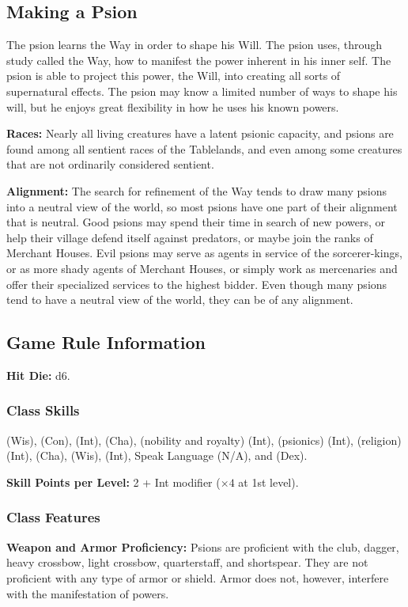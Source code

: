 \subsection{Making a Psion}
The psion learns the Way in order to shape his Will. The psion uses, through study called the Way, how to manifest the power inherent in his inner self. The psion is able to project this power, the Will, into creating all sorts of supernatural effects. The psion may know a limited number of ways to shape his will, but he enjoys great flexibility in how he uses his known powers.

\textbf{Races:} Nearly all living creatures have a latent psionic capacity, and psions are found among all sentient races of the Tablelands, and even among some creatures that are not ordinarily considered sentient.

\textbf{Alignment:} The search for refinement of the Way tends to draw many psions into a neutral view of the world, so most psions have one part of their alignment that is neutral. Good psions may spend their time in search of new powers, or help their village defend itself against predators, or maybe join the ranks of Merchant Houses. Evil psions may serve as agents in service of the sorcerer-kings, or as more shady agents of Merchant Houses, or simply work as mercenaries and offer their specialized services to the highest bidder. Even though many psions tend to have a neutral view of the world, they can be of any alignment.

\subsection{Game Rule Information}
\textbf{Hit Die:} d6.

\subsubsection{Class Skills}
 (Wis),  (Con),  (Int),  (Cha),  (nobility and royalty) (Int),  (psionics) (Int),  (religion) (Int),  (Cha),  (Wis),  (Int), Speak Language (N/A), and  (Dex).

\textbf{Skill Points per Level:} 2 + Int modifier ($\times 4$ at 1st level).

\subsubsection{Class Features}
\textbf{Weapon and Armor Proficiency:} Psions are proficient with the club, dagger, heavy crossbow, light crossbow, quarterstaff, and shortspear. They are not proficient with any type of armor or shield. Armor does not, however, interfere with the manifestation of powers.

